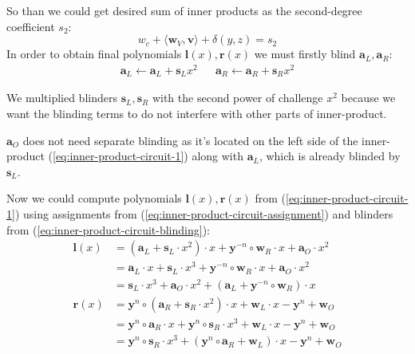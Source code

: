 \documentclass[../lecture-notes-148x210.tex]{subfiles}
\begin{document}
So than we could get desired sum of inner products as the second-degree coefficient $s_2$:
$$ w_c + \langle \mathbf{w}_V, \mathbf{v} \rangle + \delta(y, z) = s_2$$
In order to obtain final polynomials $\mathbf{l}(x), \mathbf{r}(x)$ we must firstly blind $\mathbf{a}_L, \mathbf{a}_R$:
\begin{equation}
    \begin{aligned}
    \mathbf{a}_L \gets \mathbf{a}_L + \mathbf{s}_Lx^2 && \mathbf{a}_R \gets \mathbf{a}_R + \mathbf{s}_Rx^2
    \end{aligned}
    \label{eq:inner-product-circuit-blinding}
\end{equation}
\begin{remark}
    We multiplied blinders $\mathbf{s}_L, \mathbf{s}_R$ with the second power of challenge $x^2$ because we want the blinding terms to do not interfere with other parts of inner-product.

    $\mathbf{a}_O$ does not need separate blinding as it's located on the left side of the inner-product (\ref{eq:inner-product-circuit-1}) along with $\mathbf{a}_L$, which is already blinded by $\mathbf{s}_L$.
\end{remark}

Now we could compute polynomials $\mathbf{l}(x), \mathbf{r}(x)$ from (\ref{eq:inner-product-circuit-1}) using assignments from (\ref{eq:inner-product-circuit-assignment}) and blinders from (\ref{eq:inner-product-circuit-blinding}):
\begin{equation}
    \begin{aligned}
        {\mathbf{l}}(x) &= (\mathbf{a}_L + \mathbf{s}_L \cdot x^2) \cdot x + \mathbf{y}^{-n} \circ \mathbf{w}_R \cdot x + \mathbf{a}_O \cdot x^2 \\
                  &= \mathbf{a}_L \cdot x + \mathbf{s}_L \cdot x^3 + \mathbf{y}^{-n} \circ \mathbf{w}_R \cdot x + \mathbf{a}_O \cdot x^2 \\
                  &= \mathbf{s}_L \cdot x^3 + \mathbf{a}_O \cdot x^2 + (\mathbf{a}_L + \mathbf{y}^{-n} \circ \mathbf{w}_R) \cdot x \\
        {\mathbf{r}}(x) &= \mathbf{y}^n \circ (\mathbf{a}_R + \mathbf{s}_R \cdot x^2) \cdot x + \mathbf{w}_L \cdot x - \mathbf{y}^n + \mathbf{w}_O \\
                  &= \mathbf{y}^n \circ \mathbf{a}_R \cdot x + \mathbf{y}^n \circ \mathbf{s}_R \cdot x^3 + \mathbf{w}_L \cdot x - \mathbf{y}^n + \mathbf{w}_O \\
                  &= \mathbf{y}^n \circ \mathbf{s}_R \cdot x^3 + (\mathbf{y}^n \circ \mathbf{a}_R +  \mathbf{w}_L) \cdot x - \mathbf{y}^n + \mathbf{w}_O
    \end{aligned}
    \label{eq:inner-product-circuit-polynomials}
\end{equation}
\end{document}
